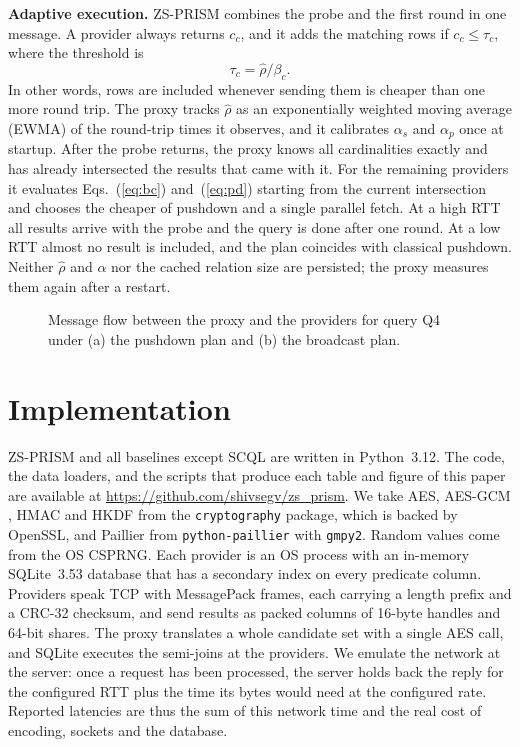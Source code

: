 \documentclass[conference]{IEEEtran}
\newcommand{\sys}{ZS-PRISM}
\begin{document}
\textbf{Adaptive execution.} \sys{} combines the probe and the first round in one message. A provider always returns $c_c$, and it adds the matching rows if $c_c\le\tau_c$, where the threshold is
\begin{equation}
 \tau_c = \hat{\rho}/\beta_c .
 \label{eq:cost}
\end{equation}
In other words, rows are included whenever sending them is cheaper than one more round trip. The proxy tracks $\hat{\rho}$ as an exponentially weighted moving average (EWMA) of the round-trip times it observes, and it calibrates $\alpha_s$ and $\alpha_p$ once at startup. After the probe returns, the proxy knows all cardinalities exactly and has already intersected the results that came with it. For the remaining providers it evaluates Eqs.~(\ref{eq:bc}) and~(\ref{eq:pd}) starting from the current intersection and chooses the cheaper of pushdown and a single parallel fetch. At a high RTT all results arrive with the probe and the query is done after one round. At a low RTT almost no result is included, and the plan coincides with classical pushdown. Neither $\hat{\rho}$ and $\alpha$ nor the cached relation size are persisted; the proxy measures them again after a restart.

\begin{figure}[t]
\centering
\resizebox{\columnwidth}{!}{}
\caption{Message flow between the proxy and the providers for query Q4 under (a) the pushdown plan and (b) the broadcast plan.}
\label{fig:seq}
\end{figure}

\section{Implementation}\label{sec:impl}
\sys{} and all baselines except SCQL are written in Python~3.12. The code, the data loaders, and the scripts that produce each table and figure of this paper are available at \url{https://github.com/shivsegv/zs_prism}. We take AES, AES-GCM \cite{nist80038d}, HMAC and HKDF from the \texttt{cryptography} package, which is backed by OpenSSL, and Paillier from \texttt{python-paillier} with \texttt{gmpy2}. Random values come from the OS CSPRNG. Each provider is an OS process with an in-memory SQLite~3.53 database that has a secondary index on every predicate column. Providers speak TCP with MessagePack frames, each carrying a length prefix and a CRC-32 checksum, and send results as packed columns of 16-byte handles and 64-bit shares. The proxy translates a whole candidate set with a single AES call, and SQLite executes the semi-joins at the providers. We emulate the network at the server: once a request has been processed, the server holds back the reply for the configured RTT plus the time its bytes would need at the configured rate. Reported latencies are thus the sum of this network time and the real cost of encoding, sockets and the database.
\end{document}
